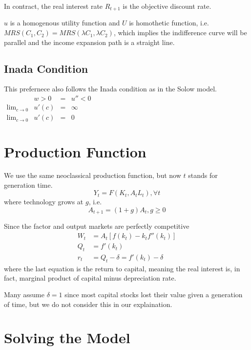 \documentclass[twocolumn, fleqn]{article}
\begin{document}
		In contract, the real interest rate $R_{t+1}$ is the objective discount rate.

		$u$ is a homogenous utility function and $U$ is homothetic function, i.e. $MRS(C_1, C_2)= MRS(\lambda C_1, \lambda C_2)$, which implies the indifference curve will be parallel and the income expansion path is a straight line.

		\subsection{Inada Condition}
			This prefernece also follows the Inada condition as in the Solow model.\\
			\(
			\begin{array}{llll}
				& w >0 & = & u''<0\\
				\lim_{c\rightarrow 0} & u'(c) & = & \infty\\
				\lim_{c\rightarrow 0} & u'(c) & = & 0
			\end{array}
			\)

	\section{Production Function}\label{sec:production-function}
		We use the same neoclassical production function, but now $t$ stands for generation time.
		\begin{equation}
			Y_t = F(K_t, A_t L_t), \forall t \label{eq:production}
		\end{equation}
		where technology grows at $g$, i.e.
		\[A_{t+1}=(1+g)A_{t}, g \geq 0\]

		Since the factor and output markets are perfectly competitive
		\begin{align*}
			W_t &= A_t [f(k_t)-k_t f''(k_t)]\\
			Q_t &= f'(k_t) \\
			r_t &= Q_t - \delta = f'(k_t)-\delta
		\end{align*}
		where the last equation is the return to capital, meaning the real interest is, in fact, marginal product of
		capital minus depreciation rate.

		\begin{note}
			Many assume \(\delta = 1\) since most capital stocks lost their value given a generation of time, but we
			do not consider this in our explaination.
		\end{note}

	\section{Solving the Model}\label{sec:solving-the-model}
\end{document}
